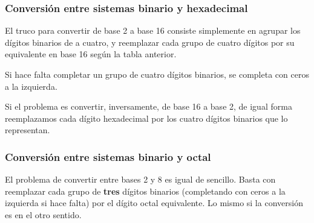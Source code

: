 \documentclass[spanish,A4,]{article}
\begin{document}
\subsubsection{Conversión entre sistemas binario y
hexadecimal}\label{conversiuxf3n-entre-sistemas-binario-y-hexadecimal}

El truco para convertir de base 2 a base 16 consiste simplemente en
agrupar los dígitos binarios de a cuatro, y reemplazar cada grupo de
cuatro dígitos por su equivalente en base 16 según la tabla anterior.

Si hace falta completar un grupo de cuatro dígitos binarios, se completa
con ceros a la izquierda.

Si el problema es convertir, inversamente, de base 16 a base 2, de igual
forma reemplazamos cada dígito hexadecimal por los cuatro dígitos
binarios que lo representan.

\subsubsection{Conversión entre sistemas binario y
octal}\label{conversiuxf3n-entre-sistemas-binario-y-octal}

El problema de convertir entre bases 2 y 8 es igual de sencillo. Basta
con reemplazar cada grupo de \textbf{tres} dígitos binarios (completando
con ceros a la izquierda si hace falta) por el dígito octal equivalente.
Lo mismo si la conversión es en el otro sentido.
\end{document}
